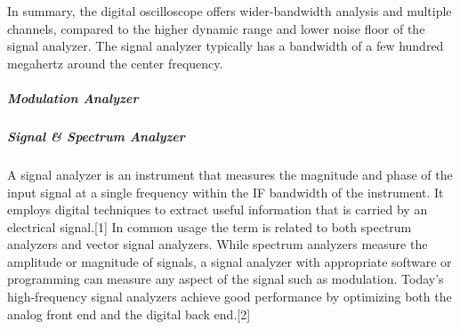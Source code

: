 



	In summary, the digital oscilloscope offers wider-bandwidth analysis and multiple channels, compared to the higher dynamic range and lower noise floor of the signal analyzer. The signal analyzer typically has a bandwidth of a few hundred megahertz around the center frequency.


\subparagraph{Modulation Analyzer}

\subparagraph{Signal \& Spectrum Analyzer}

	A signal analyzer is an instrument that measures the magnitude and phase of the input signal at a single frequency within the IF bandwidth of the instrument. It employs digital techniques to extract useful information that is carried by an electrical signal.[1] In common usage the term is related to both spectrum analyzers and vector signal analyzers. While spectrum analyzers measure the amplitude or magnitude of signals, a signal analyzer with appropriate software or programming can measure any aspect of the signal such as modulation. Today’s high-frequency signal analyzers achieve good performance by optimizing both the analog front end and the digital back end.[2]

